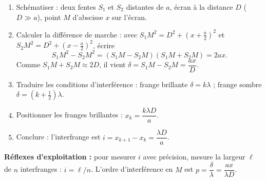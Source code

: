 \documentclass[11pt]{article}
\newcommand{\cle}[1]{{\popxbold\color{popdark}#1}}
\begin{document}
\begin{methode}[Établissement de l'interfrange $i = \lambda D / a$ (démonstration exigible au Bac)]
\begin{enumerate}
\item \cle{Schématiser} : deux fentes $S_1$ et $S_2$ distantes de $a$, écran à la distance $D$ ($D \gg a$), point $M$ d'abscisse $x$ sur l'écran.
\item \cle{Calculer la différence de marche} : avec $S_1M^2 = D^2 + \left(x + \tfrac{a}{2}\right)^2$ et $S_2M^2 = D^2 + \left(x - \tfrac{a}{2}\right)^2$, écrire
\[ S_1M^2 - S_2M^2 = (S_1M - S_2M)(S_1M + S_2M) = 2ax. \]
Comme $S_1M + S_2M \approx 2D$, il vient $\delta = S_1M - S_2M = \dfrac{ax}{D}$.
\item \cle{Traduire les conditions d'interférence} : frange brillante $\delta = k\lambda$ ; frange sombre $\delta = (k+\tfrac12)\lambda$.
\item \cle{Positionner les franges brillantes} : $x_k = \dfrac{k\lambda D}{a}$.
\item \cle{Conclure} : l'interfrange est $i = x_{k+1} - x_k = \dfrac{\lambda D}{a}$.
\end{enumerate}
\textbf{Réflexes d'exploitation :} pour mesurer $i$ avec précision, mesure la largeur $\ell$ de $n$ interfranges : $i = \ell/n$. L'ordre d'interférence en $M$ est $p = \dfrac{\delta}{\lambda} = \dfrac{ax}{\lambda D}$.
\end{methode}
\end{document}
